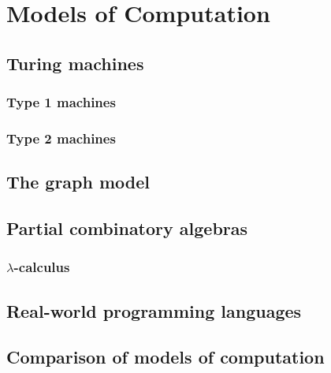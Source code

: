 \chapter{Models of Computation\label{cha:models}}



\section{Turing machines}
\label{sec:turing-machines}

\subsection{Type 1 machines}
\label{sec:type-1}


\subsection{Type 2 machines}
\label{sec:type-2}


\section{The graph model}
\label{sec:graph-model}


\section{Partial combinatory algebras}
\label{sec:pcas}

\subsection{$\lambda$-calculus}
\label{sec:lambda-calculus}




\section{Real-world programming languages}
\label{sec:programming-languages}


\section{Comparison of models of computation}
\label{sec:models-comparison}




